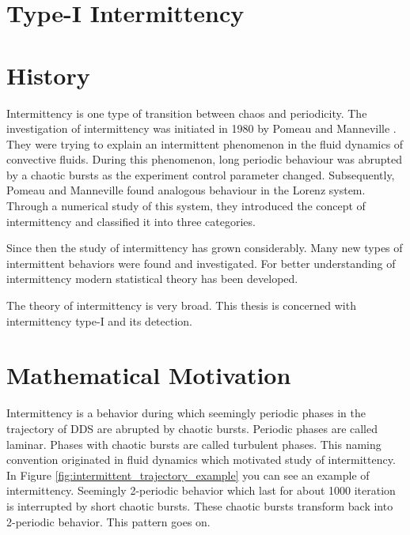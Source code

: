 \section{Type-I Intermittency}

\section{History}
Intermittency is one type of transition between chaos and periodicity.
The investigation of intermittency was initiated in 1980 by Pomeau and Manneville \cite{Pomeau1980}.
They were trying to explain an intermittent phenomenon in the fluid dynamics of convective fluids.
During this phenomenon, long periodic behaviour was abrupted by a chaotic bursts as the experiment control parameter changed.
Subsequently, Pomeau and Manneville found analogous behaviour in the Lorenz system.
Through a numerical study of this system, they introduced the concept of intermittency and classified it into three categories. \cite{Pomeau1980}
\par
Since then the study of intermittency has grown considerably.
Many new types of intermittent behaviors were found and investigated.
For better understanding of intermittency modern statistical theory has been developed.
\cite{Elaskar2017}
\par
The theory of intermittency is very broad.
This thesis is concerned with intermittency type-I and its detection.

\section{Mathematical Motivation}
Intermittency is a behavior during which seemingly periodic phases in the trajectory of DDS are abrupted by chaotic bursts.
Periodic phases are called laminar.
Phases with chaotic bursts are called turbulent phases.
This naming convention originated in fluid dynamics which motivated study of intermittency. \cite{Pomeau1980}
\\
In Figure \ref{fig:intermittent_trajectory_example} you can see an example of intermittency.
Seemingly 2-periodic behavior which last for about 1000 iteration is interrupted by short chaotic bursts.
These chaotic bursts transform back into 2-periodic behavior.
This pattern goes on.

